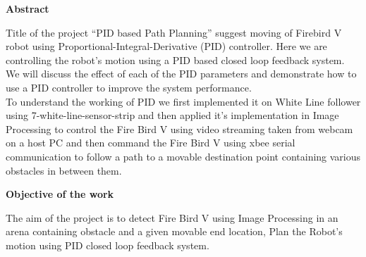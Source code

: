 \documentclass[report]{res}
\begin{document}
	\pagebreak
	
	
	\begin{center}
		{\huge \textbf{Abstract}\par}
	\end{center}
	Title of the project “PID based Path Planning” suggest moving of Firebird V robot using Proportional-Integral-Derivative (PID) controller. Here we are controlling the robot’s motion using a PID based closed loop feedback system. We will discuss the effect of each of the PID parameters and demonstrate how to use a PID controller to improve the system performance. \\
	
	To understand the working of PID we first implemented it on White Line follower using 7-white-line-sensor-strip and then applied it's implementation in Image Processing to control the Fire Bird V using video streaming taken from webcam on a host PC and then command the Fire Bird V using xbee serial communication to follow a path to a movable destination point containing various obstacles in between them. \\
	
	\begin{center}
		{\huge \textbf{Objective of the work}\par}
	\end{center}
	The aim of the project is to detect Fire Bird V using Image Processing in an arena containing  obstacle and a given movable end location, Plan the Robot’s motion using PID closed loop feedback system.\\
	
\end{document}
